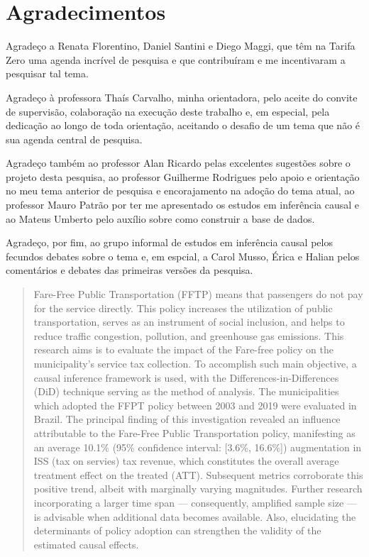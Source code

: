 \documentclass[12pt, a4paper, twoside]{article}
\numberwithin{equation}{subsection} %
\begin{document}
\newpage %

\doublespacing

\section*{Agradecimentos}


Agradeço a Renata Florentino, Daniel Santini e Diego Maggi, que têm na Tarifa Zero uma agenda incrível de pesquisa e que contribuíram e me incentivaram a pesquisar tal tema.

Agradeço à professora Thaís Carvalho, minha orientadora, pelo aceite do convite de supervisão, colaboração na execução deste trabalho e, em especial, pela dedicação ao longo de toda orientação, aceitando o desafio de um tema que não é sua agenda central de pesquisa.

Agradeço também ao professor Alan Ricardo pelas excelentes sugestões sobre o projeto desta pesquisa, ao professor Guilherme Rodrigues pelo apoio e orientação no meu tema anterior de pesquisa e encorajamento na adoção do tema atual, ao professor Mauro Patrão por ter me apresentado os estudos em inferência causal e ao Mateus Umberto pelo auxílio sobre como construir a base de dados.

Agradeço, por fim, ao grupo informal de estudos em inferência causal pelos fecundos debates sobre o tema e, em espcial, a Carol Musso, Érica e Halian pelos comentários e debates das primeiras versões da pesquisa.


\newpage



\begin{abstract}
Fare-Free Public Transportation (FFTP) means that passengers do not pay for the service directly.
This policy increases the utilization of public transportation, serves as an instrument of social inclusion, and helps to reduce traffic congestion, pollution, and greenhouse gas emissions.
This research aims is to evaluate the impact of the Fare-free policy on the municipality's service tax collection.
To accomplish such main objective, a causal inference framework is used, with the Differences-in-Differences (DiD) technique serving as the method of analysis.
The municipalities which adopted the FFPT policy between 2003 and 2019 were evaluated in Brazil.
The principal finding of this investigation revealed an influence attributable to the Fare-Free Public Transportation policy, manifesting as an average 10.1\% (95\% confidence interval: [3.6\%, 16.6\%]) augmentation in ISS (tax on servies) tax revenue, which constitutes the overall average treatment effect on the treated (ATT). 
Subsequent metrics corroborate this positive trend, albeit with marginally varying magnitudes.
Further research incorporating a larger time span --- consequently, amplified sample size --- is advisable when additional data becomes available. Also, elucidating the determinants of policy adoption can strengthen the validity of the estimated causal effects.
\end{abstract}
\end{document}
